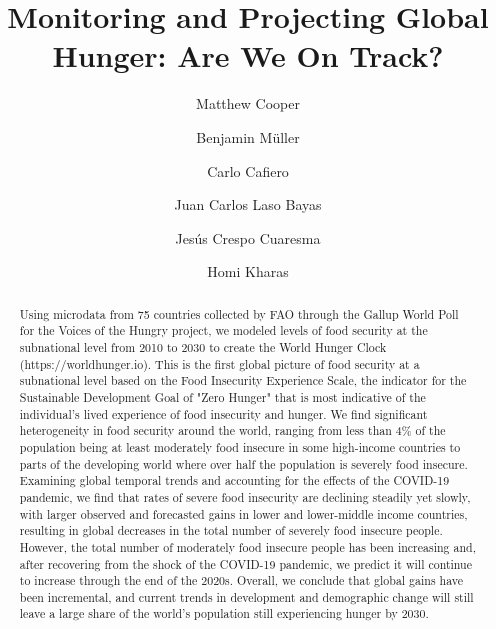 \documentclass[titlepage]{article}
\begin{document}
\title{Monitoring and Projecting Global Hunger: Are We On Track?}

\author[1,2,*]{Matthew Cooper}
\author[2,3]{Benjamin Müller}
\author[4]{Carlo Cafiero}
\author[2,5]{Juan Carlos Laso Bayas}
\author[3,5,6,7]{Jesús Crespo Cuaresma}
\author[2,8]{Homi Kharas}


\maketitle
\begin{abstract}
Using microdata from 75 countries collected by FAO through the Gallup World Poll for the Voices of the Hungry project, we modeled levels of food security at the subnational level from 2010 to 2030 to create the World Hunger Clock (https://worldhunger.io).  This is the first global picture of food security at a subnational level based on the Food Insecurity Experience Scale, the indicator for the Sustainable Development Goal of "Zero Hunger" that is most indicative of the individual's lived experience of food insecurity and hunger.  We find significant heterogeneity in food security around the world, ranging from less than 4\% of the population being at least moderately food insecure in some high-income countries to parts of the developing world where over half the population is severely food insecure.  Examining global temporal trends and accounting for the effects of the COVID-19 pandemic, we find that rates of severe food insecurity are declining steadily yet slowly, with larger observed and forecasted gains in lower and lower-middle income countries, resulting in global decreases in the total number of severely food insecure people.  However, the total number of moderately food insecure people has been increasing and, after recovering from the shock of the COVID-19 pandemic, we predict it will continue to increase through the end of the 2020s.  Overall, we conclude that global gains have been incremental, and current trends in development and demographic change will still leave a large share of the world's population still experiencing hunger by 2030.  \end{abstract}
\end{document}
